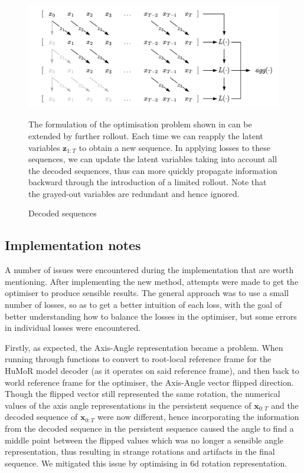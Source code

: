\begin{figure}
    \centering
    \includegraphics[width=1\textwidth]{Figures/humor/improvement/Rollout_overlap.png}
    \caption{Decoded sequences}
    \label{fig:dimm_decoded_sequences}
    \medskip
    \small
    \raggedright
    The formulation of the optimisation problem shown in  can be extended by further rollout. Each time we can reapply the latent variables $\mathbf{z}_{1:T}$ to obtain a new sequence. In applying losses to these sequences, we can update the latent variables taking into account all the decoded sequences, thus can more quickly propagate information backward through the introduction of a limited rollout. Note that the grayed-out variables are redundant and hence ignored.
\end{figure}





\subsection{Implementation notes}

A number of issues were encountered during the implementation that are worth mentioning. After implementing the new method, attempts were made to get the optimiser to produce sensible results. The general approach was to use a small number of losses, so as to get a better intuition of each loss, with the goal of better understanding how to balance the losses in the optimiser, but some errors in individual losses were encountered.

Firstly, as expected, the Axis-Angle representation became a problem. When running through functions to convert to root-local reference frame for the HuMoR model decoder (as it operates on said reference frame), and then back to world reference frame for the optimiser, the Axis-Angle vector flipped direction. Though the flipped vector still represented the same rotation, the numerical values of the axis angle representations in the persistent sequence of $\mathbf{x}_{0:T}$ and the decoded sequence of $\mathbf{x}_{0:T}$ were now different, hence incorporating the information from the decoded sequence in the persistent sequence caused the angle to find a middle point between the flipped values which was no longer a sensible angle representation, thus resulting in strange rotations and artifacts in the final sequence. We mitigated this issue by optimising in 6d rotation representation.

